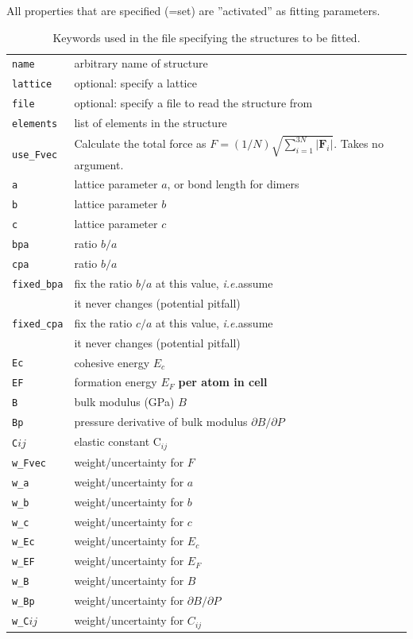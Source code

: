 \documentclass[a4paper,12pt,onecolumn]{article}
\makeatletter
\newcommand{\ie}{\emph{i.e.\@\xspace}}
\def\F{\mathbf{F}}
\makeatother
\begin{document}
All properties that are specified (=set) are ''activated'' as fitting
parameters.


\begin{table}[!h]
\caption{
Keywords used in the file specifying the structures to be fitted.
\label{tab:kw-gf}
}
\begin{center}
\begin{tabular}{|l|l|}
\hline
\hline
\verb+name+      & arbitrary name of structure \\
\verb+lattice+   & optional: specify a lattice \\
\verb+file+      & optional: specify a file to read the structure from \\
\verb+elements+  & list of elements in the structure \\
\verb+use_Fvec+ & Calculate the total force as $F = (1/N) \sqrt{ \sum_{i=1}^{3N} |\F_i| }$. Takes no argument. \\
\verb+a+         & lattice parameter $a$, or bond length for dimers \\
\verb+b+         & lattice parameter $b$ \\
\verb+c+         & lattice parameter $c$ \\
\verb+bpa+       & ratio $b/a$ \\
\verb+cpa+       & ratio $b/a$ \\
\verb+fixed_bpa+ & fix the ratio $b/a$ at this value, \ie assume \\
                 & it never changes (potential pitfall) \\
\verb+fixed_cpa+ & fix the ratio $c/a$ at this value, \ie assume \\
                 & it never changes (potential pitfall) \\
\verb+Ec+        & cohesive energy $E_c$ \\
\verb+EF+        & formation energy $E_F$ \textbf{per atom in cell} \\
\verb+B+         & bulk modulus (GPa) $B$ \\
\verb+Bp+        & pressure derivative of bulk modulus $\partial B / \partial P$ \\
\verb+C+$ij$     & elastic constant C$_{ij}$ \\
\verb+w_Fvec+    & weight/uncertainty for $F$ \\
\verb+w_a+         & weight/uncertainty for $a$ \\
\verb+w_b+         & weight/uncertainty for $b$ \\
\verb+w_c+         & weight/uncertainty for $c$ \\
\verb+w_Ec+        & weight/uncertainty for $E_c$ \\
\verb+w_EF+        & weight/uncertainty for $E_F$ \\
\verb+w_B+         & weight/uncertainty for $B$ \\
\verb+w_Bp+        & weight/uncertainty for $\partial B / \partial P$ \\
\verb+w_C+$ij$     & weight/uncertainty for $C_{ij}$ \\
\hline
\hline
\end{tabular}
\end{center}
\end{table}
\end{document}
